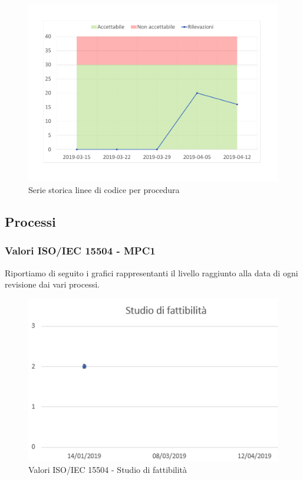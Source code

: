 \begin{figure}[H]
	\centering
	\includegraphics[scale=0.6]{images/resoconto/MPS10Chart.pdf}
	\caption{Serie storica linee di codice per procedura}	
\end{figure}

\subsection{Processi}
\subsubsection{Valori ISO/IEC 15504 - MPC1}

Riportiamo di seguito i grafici rappresentanti il livello raggiunto alla data di ogni revisione dai vari processi.


\begin{figure}[H]
	\centering
	\includegraphics[scale=1]{images/resoconto/Studio.png}
	\caption{Valori ISO/IEC 15504 - Studio di fattibilità}	
\end{figure}


